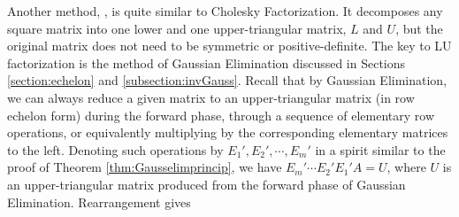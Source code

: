 Another method, , is quite similar to Cholesky Factorization. It decomposes any square matrix into one lower and one upper-triangular matrix, $L$ and $U$, but the original matrix does not need to be symmetric or positive-definite. The key to LU factorization is the method of Gaussian Elimination discussed in Sections \ref{section:echelon} and \ref{subsection:invGauss}. Recall that by Gaussian Elimination, we can always reduce a given matrix to an upper-triangular matrix (in row echelon form) during the forward phase, through a sequence of elementary row operations, or equivalently multiplying by the corresponding elementary matrices to the left. Denoting such operations by $E_1', E_2', \cdots, E_m'$ in a spirit similar to the proof of Theorem \ref{thm:Gausselimprincip}, we have $E_m'\cdots E_2'E_1'A = U$, where $U$ is an upper-triangular matrix produced from the forward phase of Gaussian Elimination. Rearrangement gives
